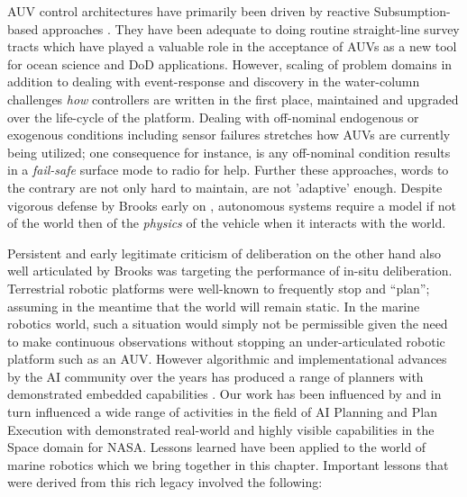 AUV control architectures have primarily been driven by reactive
Subsumption-based approaches \cite{brooks86}. They have been adequate
to doing routine straight-line survey tracts which have played a
valuable role in the acceptance of AUVs as a new tool for ocean
science and DoD applications. However, scaling of problem domains in
addition to dealing with event-response and discovery in the
water-column challenges \emph{how} controllers are written in the
first place, maintained and upgraded over the life-cycle of the
platform. Dealing with off-nominal endogenous or exogenous conditions
including sensor failures stretches how AUVs are currently being
utilized; one consequence for instance, is any off-nominal condition
results in a \emph{fail-safe} surface mode to radio for help. Further
these approaches, words to the contrary are not only hard to maintain,
are not 'adaptive' enough. Despite vigorous defense by Brooks early on
\cite{Brooks91intelligencewithoutrea,Brooks91intelligencewithoutrep},
autonomous systems require a model if not of the world then of the 
\emph{physics} of the vehicle when it interacts with the world.

Persistent and early legitimate criticism of deliberation on the other
hand also well articulated by Brooks
\cite{Brooks91intelligencewithoutrea,Brooks91intelligencewithoutrep}
was targeting the performance of in-situ deliberation. Terrestrial
robotic platforms were well-known to frequently stop and ``plan''; 
assuming in the meantime that the world will remain static. In
the marine robotics world, such a situation would simply not be
permissible given the need to make continuous observations without
stopping an under-articulated robotic platform such as an AUV. However
algorithmic and implementational advances by the AI community over the
years has produced a range of planners with demonstrated embedded
capabilities
\cite{simmons94,Haigh98,alami:1998p820,chien00,mus98,teichteil07}. Our
work has been influenced by and in turn influenced a wide range of
activities in the field of AI Planning and Plan Execution with
demonstrated real-world and highly visible capabilities in the Space
domain \cite{mus98,rajan00,aichang04,bresina05} for NASA. Lessons
learned have been applied to the world of marine robotics which we
bring together in this chapter. Important lessons that were derived
from this rich legacy involved the following:

